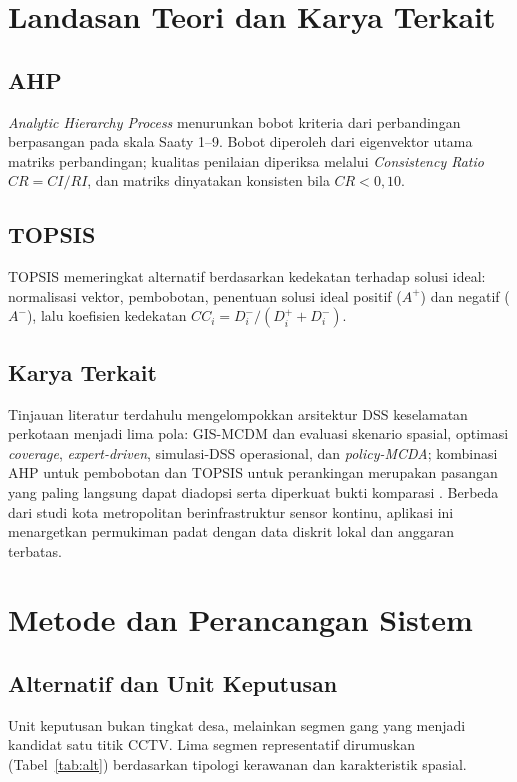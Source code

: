 \documentclass[10pt,twocolumn,a4paper]{article}
\begin{document}
\section{Landasan Teori dan Karya Terkait}

\subsection{AHP}
\textit{Analytic Hierarchy Process} \cite{saaty} menurunkan bobot kriteria dari perbandingan berpasangan pada skala Saaty 1--9. Bobot diperoleh dari eigenvektor utama matriks perbandingan; kualitas penilaian diperiksa melalui \textit{Consistency Ratio} $CR=CI/RI$, dan matriks dinyatakan konsisten bila $CR<0{,}10$.

\subsection{TOPSIS}
TOPSIS \cite{hwang} memeringkat alternatif berdasarkan kedekatan terhadap solusi ideal: normalisasi vektor, pembobotan, penentuan solusi ideal positif ($A^{+}$) dan negatif ($A^{-}$), lalu koefisien kedekatan $CC_i = D_i^{-}/(D_i^{+}+D_i^{-})$.

\subsection{Karya Terkait}
Tinjauan literatur terdahulu mengelompokkan arsitektur DSS keselamatan perkotaan menjadi lima pola: GIS-MCDM dan evaluasi skenario spasial, optimasi \textit{coverage}, \textit{expert-driven}, simulasi-DSS operasional, dan \textit{policy-MCDA}; kombinasi AHP untuk pembobotan dan TOPSIS untuk perankingan merupakan pasangan yang paling langsung dapat diadopsi \cite{kanj2024} serta diperkuat bukti komparasi \cite{baddour2026}. Berbeda dari studi kota metropolitan berinfrastruktur sensor kontinu, aplikasi ini menargetkan permukiman padat dengan data diskrit lokal dan anggaran terbatas.

\section{Metode dan Perancangan Sistem}

\subsection{Alternatif dan Unit Keputusan}
Unit keputusan bukan tingkat desa, melainkan segmen gang yang menjadi kandidat satu titik CCTV. Lima segmen representatif dirumuskan (Tabel~\ref{tab:alt}) berdasarkan tipologi kerawanan dan karakteristik spasial.
\end{document}
